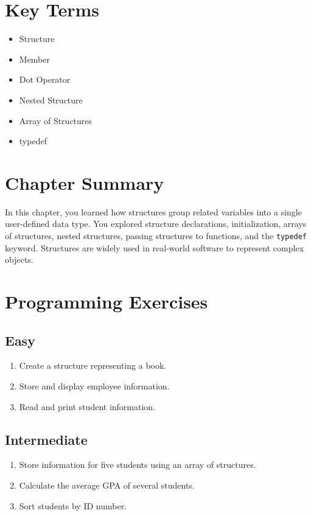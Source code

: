 \documentclass[12pt,openany]{book}
\begin{document}
\section{Key Terms}

\begin{itemize}
    \item Structure
    \item Member
    \item Dot Operator
    \item Nested Structure
    \item Array of Structures
    \item typedef
\end{itemize}

\section{Chapter Summary}

In this chapter, you learned how structures group related variables into a single user-defined data type. You explored structure declarations, initialization, arrays of structures, nested structures, passing structures to functions, and the \texttt{typedef} keyword. Structures are widely used in real-world software to represent complex objects.

\section{Programming Exercises}

\subsection*{Easy}

\begin{enumerate}
    \item Create a structure representing a book.
    \item Store and display employee information.
    \item Read and print student information.
\end{enumerate}

\subsection*{Intermediate}

\begin{enumerate}
    \item Store information for five students using an array of structures.
    \item Calculate the average GPA of several students.
    \item Sort students by ID number.
\end{enumerate}
\end{document}
